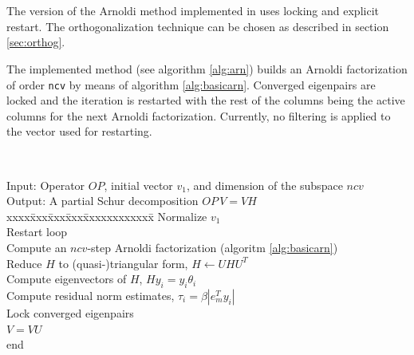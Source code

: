 \section{}

The version of the Arnoldi method implemented in \slepc uses locking and explicit restart. The orthogonalization technique can be chosen as described in section \ref{sec:orthog}.

The implemented method (see algorithm \ref{alg:arn}) builds an Arnoldi factorization of order \Verb!ncv! by means of algorithm \ref{alg:basicarn}. Converged eigenpairs are locked and the iteration is restarted with the rest of the columns being the active columns for the next Arnoldi factorization. Currently, no filtering is applied to the vector used for restarting.

\begin{algorithm}~\rm
\begin{tabbing}
Input: Operator $O\!P$, initial vector $v_1$, and dimension of the subspace $ncv$ \\
Output: A partial Schur decomposition $O\!P\,V=VH$ \\
xxxx\=xxx\=xxx\=xxx\=xxxxxxxxxxxx\=\kill
\> Normalize $v_1$\\
\> Restart loop\\
\> \> Compute an $ncv$-step Arnoldi factorization (algoritm \ref{alg:basicarn})\\
\> \> Reduce $H$ to (quasi-)triangular form, $H\leftarrow UHU^T$\\
\> \> Compute eigenvectors of $H$, $Hy_i=y_i\theta_i$ \\
\> \> Compute residual norm estimates, $\tau_i=\beta |e_m^Ty_i|$ \\
\> \> Lock converged eigenpairs\\
\> \> $V=VU$\\
\> end\\
\end{tabbing}
\end{algorithm}

